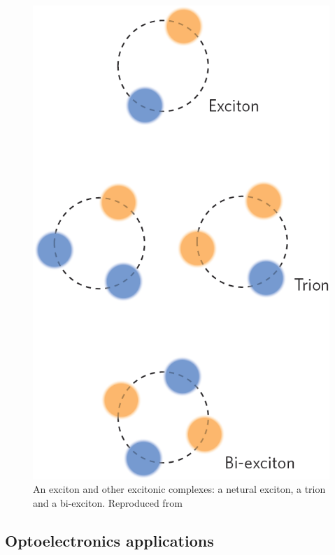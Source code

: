 \begin{figure}[!ht]
	\begin{center}
		\includegraphics[scale=0.35]{TMDCQuasiparticles.png}
		\caption{An exciton and other excitonic complexes: a netural exciton, a trion and a bi-exciton. Reproduced from \cite{Mak2016}}
		\label{fig:TMDCQuasiparticles}
	\end{center}
\end{figure}


\subsection{Optoelectronics applications} 

